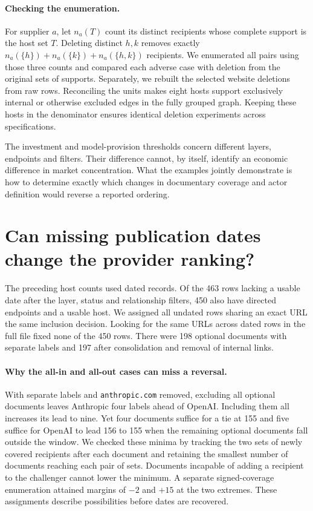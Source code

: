 \paragraph{Checking the enumeration.}
For supplier $a$, let $n_a(T)$ count its distinct recipients whose complete support is the host set $T$. Deleting distinct $h,k$ removes exactly $n_a(\{h\})+n_a(\{k\})+n_a(\{h,k\})$ recipients. We enumerated all pairs using those three counts and compared each adverse case with deletion from the original sets of supports. Separately, we rebuilt the selected website deletions from raw rows. Reconciling the units makes eight hosts support exclusively internal or otherwise excluded edges in the fully grouped graph. Keeping these hosts in the denominator ensures identical deletion experiments across specifications.

The investment and model-provision thresholds concern different layers, endpoints and filters. Their difference cannot, by itself, identify an economic difference in market concentration. What the examples jointly demonstrate is how to determine exactly which changes in documentary coverage and actor definition would reverse a reported ordering.

\section{Can missing publication dates change the provider ranking?}
The preceding host counts used dated records. Of the 463 rows lacking a usable date after the layer, status and relationship filters, 450 also have directed endpoints and a usable host. We assigned all undated rows sharing an exact URL the same inclusion decision. Looking for the same URLs across dated rows in the full file fixed none of the 450 rows. There were 198 optional documents with separate labels and 197 after consolidation and removal of internal links.

\paragraph{Why the all-in and all-out cases can miss a reversal.}
With separate labels and \texttt{anthropic.com} removed, excluding all optional documents leaves Anthropic four labels ahead of OpenAI. Including them all increases its lead to nine. Yet four documents suffice for a tie at 155 and five suffice for OpenAI to lead 156 to 155 when the remaining optional documents fall outside the window. We checked these minima by tracking the two sets of newly covered recipients after each document and retaining the smallest number of documents reaching each pair of sets. Documents incapable of adding a recipient to the challenger cannot lower the minimum. A separate signed-coverage enumeration attained margins of $-2$ and $+15$ at the two extremes. These assignments describe possibilities before dates are recovered.


